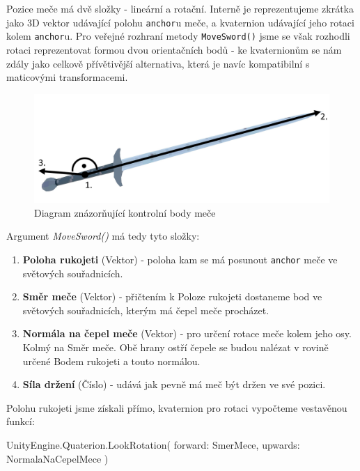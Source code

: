Pozice meče má dvě složky - lineární a rotační. Interně je reprezentujeme zkrátka jako 3D vektor udávající polohu \texttt{anchor}u meče, a kvaternion udávající jeho rotaci kolem \texttt{anchor}u. Pro veřejné rozhraní metody \texttt{MoveSword()} jsme se však rozhodli rotaci reprezentovat formou dvou orientačních bodů - ke kvaternionům se nám zdály jako celkově přívětivější alternativa, která je navíc kompatibilní s maticovými transformacemi.

\begin{figure}[ht]\centering
  \center
  \includegraphics[width=140mm]{../img/diagram-swordPositioning.png}
  \caption{Diagram znázorňující kontrolní body meče}
  \label{obr05:swordPositioningDiagram}
\end{figure} 

Argument \textit{MoveSword()} má tedy tyto složky:
\begin{enumerate}
    \item \textbf{Poloha rukojeti} (Vektor) - poloha kam se má posunout \texttt{anchor} meče ve světových souřadnicích.
    \item \textbf{Směr meče} (Vektor) - přičtením k Poloze rukojeti dostaneme bod ve světových souřadnicích, kterým má čepel meče procházet.
    \item \textbf{Normála na čepel meče} (Vektor) - pro určení rotace meče kolem jeho osy. Kolmý na Směr meče. Obě hrany ostří čepele se budou nalézat v rovině určené Bodem rukojeti a touto normálou.   
    \item \textbf{Síla držení} (Číslo) - udává jak pevně má meč být držen ve své pozici.
\end{enumerate}

Polohu rukojeti jsme získali přímo, kvaternion pro rotaci vypočteme vestavěnou funkcí:

\begin{code}
 UnityEngine.Quaterion.LookRotation(
   forward: SmerMece,
   upwards: NormalaNaCepelMece
 )
\end{code}


